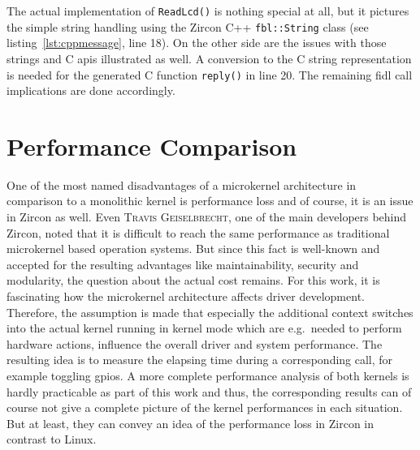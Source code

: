 The actual implementation of \texttt{ReadLcd()} is nothing special at all, but it pictures the simple string handling using the Zircon C++ \texttt{fbl::String} class (see listing~\ref{lst:cppmessage}, line 18).
On the other side are the issues with those strings and C \acp{api} illustrated as well.
A conversion to the C string representation is needed for the generated C function \texttt{reply()} in line 20.
The remaining \ac{fidl} call implications are done accordingly.

 
\section{Performance Comparison}
One of the most named disadvantages of a microkernel architecture in comparison to a monolithic kernel is performance loss and of course, it is an issue in Zircon as well.
Even \textsc{Travis Geiselbrecht}, one of the main developers behind Zircon, noted that it is difficult to reach the same performance as traditional microkernel based operation systems\cite{chat-zircon-arch}.
But since this fact is well-known and accepted for the resulting advantages like maintainability, security and modularity, the question about the actual cost remains.
For this work, it is fascinating how the microkernel architecture affects driver development.
Therefore, the assumption is made that especially the additional context switches into the actual kernel running in kernel mode which are e.g.\ needed to perform hardware actions, influence the overall driver and system performance.
The resulting idea is to measure the elapsing time during a corresponding call, for example toggling \acp{gpio}.
A more complete performance analysis of both kernels is hardly practicable as part of this work and thus, the corresponding results can of course not give a complete picture of the kernel performances in each situation.
But at least, they can convey an idea of the performance loss in Zircon in contrast to Linux.

